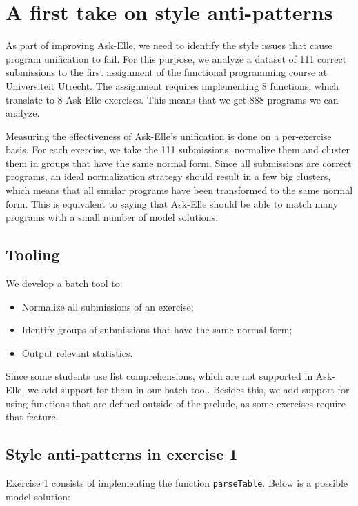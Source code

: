 \chapter{A first take on style anti-patterns}
\label{sec:first-take}

As part of improving Ask-Elle, we need to identify the style issues that cause program unification to fail. For this purpose, we analyze a dataset of 111 correct submissions to the first assignment of the functional programming course at Universiteit Utrecht. The assignment requires implementing 8 functions, which translate to 8 Ask-Elle exercises. This means that we get 888 programs we can analyze.

Measuring the effectiveness of Ask-Elle's unification is done on a per-exercise basis. For each exercise, we take the 111 submissions, normalize them and cluster them in groups that have the same normal form. Since all submissions are correct programs, an ideal normalization strategy should result in a few big clusters, which means that all similar programs have been transformed to the same normal form. This is equivalent to saying that Ask-Elle should be able to match many programs with a small number of model solutions.

\section{Tooling}

We develop a batch tool to:

\begin{itemize}
    \item Normalize all submissions of an exercise;
    \item Identify groups of submissions that have the same normal form;
    \item Output relevant statistics.
\end{itemize}

Since some students use list comprehensions, which are not supported in Ask-Elle, we add support for them in our batch tool. Besides this, we add support for using functions that are defined outside of the prelude, as some exercises require that feature.

\section{Style anti-patterns in exercise 1}

Exercise 1 consists of implementing the function \texttt{parseTable}. Below is a possible model solution:

